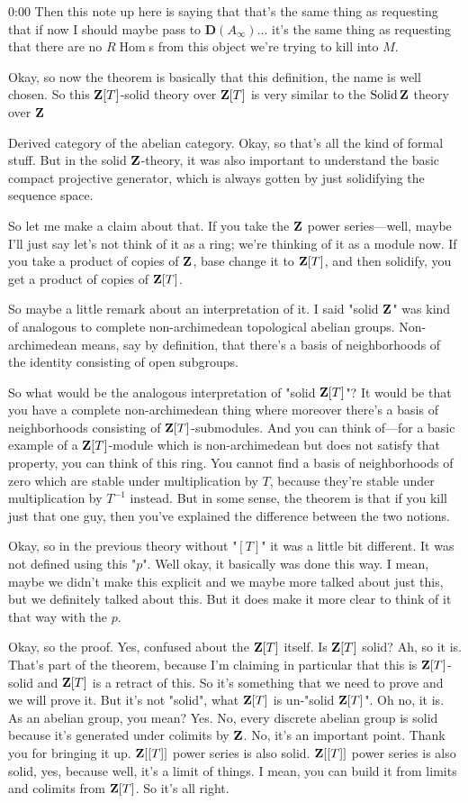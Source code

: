 \begin{unfinished}{0:00}
Then this note up here is saying that that's the same thing as requesting that if now I should maybe pass to $\mathbf{D}(A_\infty)$... it's the same thing as requesting that there are no $R\operatorname{Hom}$s from this object we're trying to kill into $M$.

Okay, so now the theorem is basically that this definition, the name is well chosen. So this $\mathbf Z[T]$-solid theory over $\mathbf Z[T]$ is very similar to the $\operatorname{Solid} \mathbf Z$ theory over $\mathbf Z$

Derived category of the abelian category. Okay, so that's all the kind of formal stuff. But in the solid $\mathbf Z$-theory, it was also important to understand the basic compact projective generator, which is always gotten by just solidifying the sequence space.

So let me make a claim about that. If you take the $\mathbf Z$ power series---well, maybe I'll just say let's not think of it as a ring; we're thinking of it as a module now. If you take a product of copies of $\mathbf Z$, base change it to $\mathbf Z[T]$, and then solidify, you get a product of copies of $\mathbf Z[T]$.

So maybe a little remark about an interpretation of it. I said "solid $\mathbf Z$" was kind of analogous to complete non-archimedean topological abelian groups. Non-archimedean means, say by definition, that there's a basis of neighborhoods of the identity consisting of open subgroups.

So what would be the analogous interpretation of "solid $\mathbf Z[T]$"? It would be that you have a complete non-archimedean thing where moreover there's a basis of neighborhoods consisting of $\mathbf Z[T]$-submodules. And you can think of---for a basic example of a $\mathbf Z[T]$-module which is non-archimedean but does not satisfy that property, you can think of this ring. You cannot find a basis of neighborhoods of zero which are stable under multiplication by $T$, because they're stable under multiplication by $T^{-1}$ instead. But in some sense, the theorem is that if you kill just that one guy, then you've explained the difference between the two notions.

Okay, so in the previous theory without "$[T]$" it was a little bit different. It was not defined using this "$p$". Well okay, it basically was done this way. I mean, maybe we didn't make this explicit and we maybe more talked about just this, but we definitely talked about this. But it does make it more clear to think of it that way with the $p$.

Okay, so the proof. Yes, confused about the $\mathbf Z[T]$ itself. Is $\mathbf Z[T]$ solid? Ah, so it is. That's part of the theorem, because I'm claiming in particular that this is $\mathbf Z[T]$-solid and $\mathbf Z[T]$ is a retract of this. So it's something that we need to prove and we will prove it. But it's not "solid", what $\mathbf Z[T]$ is un-"solid $\mathbf Z[T]$". Oh no, it is. As an abelian group, you mean? Yes. No, every discrete abelian group is solid because it's generated under colimits by $\mathbf Z$. No, it's an important point. Thank you for bringing it up. $\mathbf Z[[T]]$ power series is also solid. $\mathbf Z[[T]]$ power series is also solid, yes, because well, it's a limit of things. I mean, you can build it from limits and colimits from $\mathbf Z[T]$. So it's all right.


\end{unfinished}
